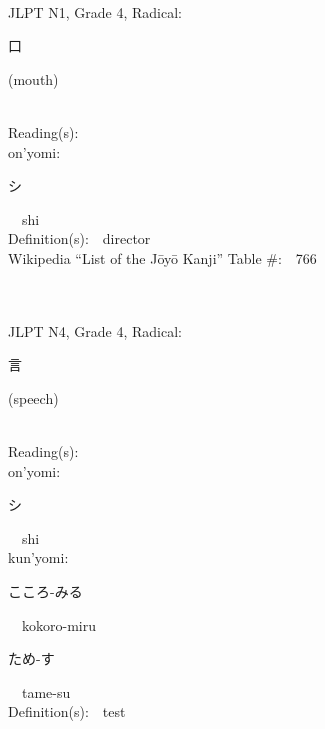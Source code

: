 \begin{multicols}{2}
{\fontsize{34pt}{40pt}  }\ \ \\  %
{JLPT N1, Grade 4, Radical:\ \ {\begin{CJK}{UTF8}{min} 口 \end{CJK}} (mouth) } \\
Reading(s):\ \ \\
{\hspace*{1em}}on'yomi:\ \ \\
{\hspace*{2em}}{\begin{CJK}{UTF8}{min} シ \end{CJK}}\ \ shi\ \ \\
Definition(s):\ \ director \\
Wikipedia ``List of the J\=oy\=o Kanji'' Table \#:\ \ 766 \\
\ \ \\
{\fontsize{34pt}{40pt}  }\ \ \\  %
{JLPT N4, Grade 4, Radical:\ \ {\begin{CJK}{UTF8}{min} 言 \end{CJK}} (speech) } \\
Reading(s):\ \ \\
{\hspace*{1em}}on'yomi:\ \ \\
{\hspace*{2em}}{\begin{CJK}{UTF8}{min} シ \end{CJK}}\ \ shi\ \ \\
{\hspace*{1em}}kun'yomi:\ \ \\
{\hspace*{2em}}{\begin{CJK}{UTF8}{min} こころ-みる \end{CJK}}\ \ kokoro-miru\ \ \\
{\hspace*{2em}}{\begin{CJK}{UTF8}{min} ため-す \end{CJK}}\ \ tame-su\ \ \\
Definition(s):\ \ test \\

\end{multicols}

